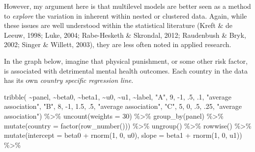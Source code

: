 \documentclass[
  letterpaper,
  DIV=11,
  numbers=noendperiod]{scrreprt}
\newenvironment{Shaded}{\begin{snugshade}}{\end{snugshade}}
\newcommand{\AttributeTok}[1]{\textcolor[rgb]{0.40,0.45,0.13}{#1}}
\newcommand{\DecValTok}[1]{\textcolor[rgb]{0.68,0.00,0.00}{#1}}
\newcommand{\FloatTok}[1]{\textcolor[rgb]{0.68,0.00,0.00}{#1}}
\newcommand{\FunctionTok}[1]{\textcolor[rgb]{0.28,0.35,0.67}{#1}}
\newcommand{\NormalTok}[1]{\textcolor[rgb]{0.00,0.23,0.31}{#1}}
\newcommand{\SpecialCharTok}[1]{\textcolor[rgb]{0.37,0.37,0.37}{#1}}
\newcommand{\StringTok}[1]{\textcolor[rgb]{0.13,0.47,0.30}{#1}}
\begin{document}
However, my argument here is that multilevel models are better seen as a
method to \emph{explore} the variation in inherent within nested or
clustered data. Again, while these issues are well understood within the
statistical literature (Kreft \& de Leeuw, 1998; Luke, 2004;
Rabe-Hesketh \& Skrondal, 2012; Raudenbush \& Bryk, 2002; Singer \&
Willett, 2003), they are less often noted in applied research.

In the graph below, imagine that physical punishment, or some other risk
factor, is associated with detrimental mental health outcomes. Each
country in the data has its own \emph{country specific regression line}.

\begin{Shaded}
\begin{Highlighting}[]
\FunctionTok{tribble}\NormalTok{(}
  \SpecialCharTok{\textasciitilde{}}\NormalTok{panel, }\SpecialCharTok{\textasciitilde{}}\NormalTok{beta0, }\SpecialCharTok{\textasciitilde{}}\NormalTok{beta1, }\SpecialCharTok{\textasciitilde{}}\NormalTok{u0, }\SpecialCharTok{\textasciitilde{}}\NormalTok{u1, }\SpecialCharTok{\textasciitilde{}}\NormalTok{label,}
  \StringTok{"A"}\NormalTok{, }\DecValTok{9}\NormalTok{, }\SpecialCharTok{{-}}\DecValTok{1}\NormalTok{, .}\DecValTok{5}\NormalTok{, .}\DecValTok{1}\NormalTok{, }\StringTok{"average association"}\NormalTok{,}
  \StringTok{"B"}\NormalTok{, }\DecValTok{8}\NormalTok{, }\SpecialCharTok{{-}}\DecValTok{1}\NormalTok{, }\FloatTok{1.5}\NormalTok{, .}\DecValTok{5}\NormalTok{, }\StringTok{"average association"}\NormalTok{,}
  \StringTok{"C"}\NormalTok{, }\DecValTok{5}\NormalTok{, }\DecValTok{0}\NormalTok{, .}\DecValTok{5}\NormalTok{, .}\DecValTok{25}\NormalTok{, }\StringTok{"average association"}\NormalTok{) }\SpecialCharTok{\%\textgreater{}\%} 
  \FunctionTok{uncount}\NormalTok{(}\AttributeTok{weights =} \DecValTok{30}\NormalTok{) }\SpecialCharTok{\%\textgreater{}\%}
  \FunctionTok{group\_by}\NormalTok{(panel) }\SpecialCharTok{\%\textgreater{}\%}
  \FunctionTok{mutate}\NormalTok{(}\AttributeTok{country =} \FunctionTok{factor}\NormalTok{(}\FunctionTok{row\_number}\NormalTok{())) }\SpecialCharTok{\%\textgreater{}\%}
  \FunctionTok{ungroup}\NormalTok{() }\SpecialCharTok{\%\textgreater{}\%}
  \FunctionTok{rowwise}\NormalTok{() }\SpecialCharTok{\%\textgreater{}\%}
  \FunctionTok{mutate}\NormalTok{(}\AttributeTok{intercept =}\NormalTok{ beta0 }\SpecialCharTok{+} \FunctionTok{rnorm}\NormalTok{(}\DecValTok{1}\NormalTok{, }\DecValTok{0}\NormalTok{, u0),}
         \AttributeTok{slope =}\NormalTok{ beta1 }\SpecialCharTok{+} \FunctionTok{rnorm}\NormalTok{(}\DecValTok{1}\NormalTok{, }\DecValTok{0}\NormalTok{, u1)) }\SpecialCharTok{\%\textgreater{}\%}

\end{Highlighting}
\end{Shaded}
\end{document}
